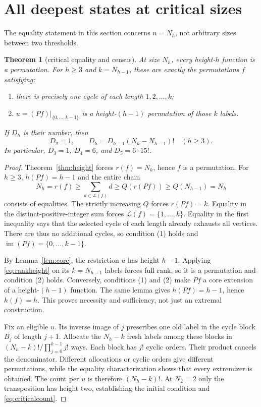 \documentclass[a4paper,10pt]{amsart}
\newtheorem{theorem}{Theorem}[section]
\theoremstyle{remark}
\newcommand{\im}{\operatorname{im}}
\newcommand{\calL}{\mathcal L}
\begin{document}
\section{All deepest states at critical sizes}
The equality statement in this section concerns $n=N_h$, not arbitrary
sizes between two thresholds.
\begin{theorem}[critical equality and census]\label{thm:critical}
At size $N_h$, every height-$h$ function is a permutation. For $h\ge3$
and $k=N_{h-1}$, these are exactly the permutations $f$ satisfying:
\begin{enumerate}
\item there is precisely one cycle of each length $1,2,\ldots,k$;
\item $u=(P f)|_{\{0,\ldots,k-1\}}$ is a height-$(h-1)$ permutation
      of those $k$ labels.
\end{enumerate}
If $D_h$ is their number, then
\begin{equation}\label{eq:criticalcount}
 D_2=1,\qquad D_h=D_{h-1}(N_h-N_{h-1})!\quad(h\ge3).
\end{equation}
In particular, $D_3=1$, $D_4=6$, and $D_5=6\cdot15!$.
\end{theorem}
\begin{proof}
Theorem~\ref{thm:height} forces $r(f)=N_h$, hence $f$ is a permutation.
For $h\ge3$, $h(Pf)=h-1$ and the entire chain
\begin{equation}\label{eq:equalitychain}
 N_h=r(f)\ge\sum_{d\in\calL(f)}d
 \ge Q(r(Pf))\ge Q(N_{h-1})=N_h
\end{equation}
consists of equalities. The strictly increasing $Q$ forces $r(Pf)=k$.
Equality in the distinct-positive-integer sum forces
$\calL(f)=\{1,\ldots,k\}$. Equality in the first inequality says that
the selected cycle of each length already exhausts all vertices.
There are thus no additional cycles, so condition (1) holds and
$\im(Pf)=\{0,\ldots,k-1\}$.

By Lemma~\ref{lem:core}, the restriction $u$ has height $h-1$.
Applying \eqref{eq:rankheight} on its $k=N_{h-1}$ labels forces full
rank, so it is a permutation and condition (2) holds. Conversely,
conditions (1) and (2) make $Pf$ a core extension of a height-$(h-1)$
function. The same lemma gives $h(Pf)=h-1$, hence $h(f)=h$. This proves
necessity and sufficiency, not just an extremal construction.

Fix an eligible $u$. Its inverse image of $j$ prescribes one old label
in the cycle block $B_j$ of length $j+1$. Allocate the $N_h-k$ fresh
labels among these blocks in
$(N_h-k)!/\prod_{j=0}^{k-1}j!$ ways. Each block has $j!$ cyclic orders.
Their product cancels the denominator. Different allocations or cyclic
orders give different permutations, while the equality characterization
shows that every extremizer is obtained. The count per $u$ is therefore
$(N_h-k)!$. At $N_2=2$ only the transposition has height two, establishing
the initial condition and \eqref{eq:criticalcount}.
\end{proof}
\end{document}
